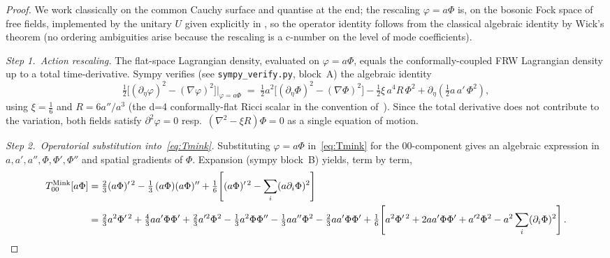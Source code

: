 \documentclass[11pt]{article}
\begin{document}
\begin{proof}
We work classically on the common Cauchy surface and quantise at the end;
the rescaling $\varphi=a\Phi$ is, on the bosonic Fock space of free fields,
implemented by the unitary $U$ given explicitly in
\cite[\S3.2]{Frob2023}, so the operator identity follows from the
classical algebraic identity by Wick's theorem (no ordering ambiguities arise
because the rescaling is a c-number on the level of mode coefficients).

\smallskip
\emph{Step 1.\ Action rescaling.}  The flat-space Lagrangian density,
evaluated on $\varphi=a\Phi$, equals the conformally-coupled FRW
Lagrangian density up to a total time-derivative.  Sympy verifies (see
\texttt{sympy\_verify.py}, block~A) the algebraic identity
\begin{equation}
\tfrac{1}{2}\bigl[(\partial_\eta\varphi)^2-(\nabla\varphi)^2\bigr]\Big|_{\varphi=a\Phi}
\;=\;
\tfrac{1}{2}a^2\bigl[(\partial_\eta\Phi)^2-(\nabla\Phi)^2\bigr]
-\tfrac{1}{2}\xi\,a^4 R\,\Phi^2
+\partial_\eta\!\left(\tfrac{1}{2}a\,a'\,\Phi^2\right),
\label{eq:lagrangian-id}
\end{equation}
using $\xi=\frac16$ and $R=6a''/a^3$ (the d=4 conformally-flat
Ricci scalar in the convention of~\cite[eq.~(3.3a)]{Frob2023}).  Since the
total derivative does not contribute to the variation, both fields satisfy
$\partial^2\varphi=0$ resp.\ $(\nabla^2-\xi R)\Phi=0$ as a single equation
of motion.

\smallskip
\emph{Step 2.\ Operatorial substitution into~\eqref{eq:Tmink}.}
Substituting $\varphi=a\Phi$ in~\eqref{eq:Tmink} for the $00$-component
gives an algebraic expression in $a,a',a'',\Phi,\Phi',\Phi''$ and spatial
gradients of $\Phi$.  Expansion (sympy block~B) yields, term by term,
\begin{align*}
T^{\rm Mink}_{00}[a\Phi]
&= \tfrac{2}{3}(a\Phi)'^{\,2}
  - \tfrac{1}{3}\,(a\Phi)(a\Phi)''
  + \tfrac{1}{6}\!\left[ (a\Phi)'^{\,2} - \sum_i(a\partial_i\Phi)^2\right] \\
&= \tfrac{2}{3}a^2\Phi'^{\,2}
   + \tfrac{4}{3}a a'\Phi\Phi'
   + \tfrac{2}{3}a'^2\Phi^2
   - \tfrac{1}{3}a^2\Phi\Phi''
   - \tfrac{1}{3}a a''\Phi^2
   - \tfrac{2}{3}a a'\Phi\Phi'
   + \tfrac{1}{6}\!\left[a^2\Phi'^{\,2} + 2a a'\Phi\Phi' + a'^2\Phi^2
                          -a^2\sum_i(\partial_i\Phi)^2\right].
\end{align*}


\end{proof}
\end{document}
